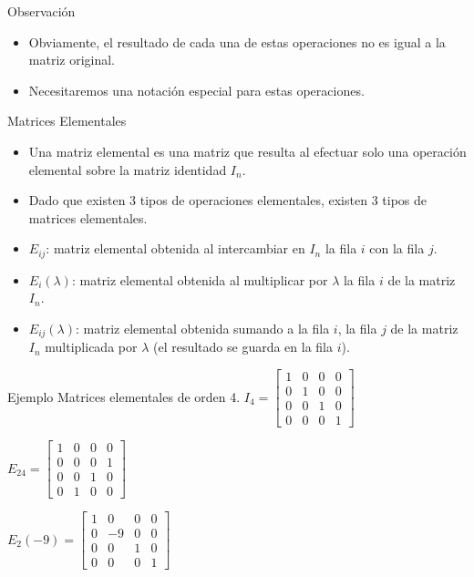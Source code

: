 {Observación}
\begin{itemize}
\item
Obviamente, el resultado de cada una de estas operaciones no es igual a la matriz  original.
\item
Necesitaremos una notación especial para estas operaciones.

\end{itemize}


{Matrices Elementales}
\begin{itemize}
\item
Una matriz elemental es una matriz que resulta al efectuar solo una operación elemental sobre la matriz identidad $I_n$.

\item
Dado que existen 3 tipos de operaciones elementales, existen 3 tipos de matrices elementales.

\item
$E_{ij}$: matriz elemental obtenida al intercambiar en $I_n$ la fila $i$ con la fila $j$.

\item
$E_{i}(\lambda)$: matriz elemental obtenida al multiplicar por $\lambda$ la fila $i$  de la matriz  $I_n$.

\item
$E_{ij}(\lambda)$: matriz elemental obtenida sumando a la fila $i$,  la fila $j$  de la matriz $I_n$ multiplicada por $\lambda$ (el resultado se guarda en la fila $i$).

\end{itemize}


{Ejemplo}
Matrices elementales de orden 4.
$I_4=\begin{bmatrix}
1 &  0 & 0 & 0\\
0 &  1 & 0 & 0\\
0 &  0 & 1 & 0\\
0 &  0 & 0 & 1
\end{bmatrix}
$


$E_{24}=\begin{bmatrix}
1 &  0 & 0 & 0\\
0 &  0 & 0 & 1\\
0 &  0 & 1 & 0\\
0 &  1 & 0 & 0
\end{bmatrix}
$

$E_{2}(-9)
=\begin{bmatrix}
1 &  0 & 0 & 0\\
0 &  -9 & 0 & 0\\
0 &  0 & 1 & 0\\
0 &  0 & 0 & 1
\end{bmatrix}
$


